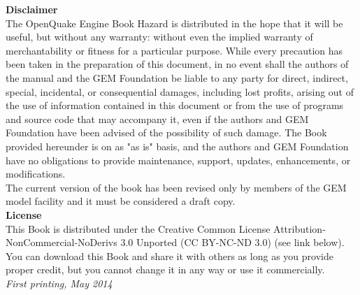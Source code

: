 \documentclass[11pt,fleqn]{book} %
\begin{document}
\noindent 
   {\bf{Disclaimer}} \hfill \\
   The OpenQuake Engine Book Hazard is distributed in 
   the hope that it will be useful, but without any warranty: without 
   even the implied warranty of merchantability or fitness for a 
   particular purpose. While every 
   precaution has been taken in the preparation of this document, in 
   no event shall the authors of the manual and the GEM Foundation be 
   liable to any party for direct, indirect, special, incidental, or 
   consequential damages, including lost profits, arising out of the 
   use of information contained in this document or from the use of 
   programs and source code that may accompany it, even if the authors 
   and GEM Foundation have been advised of the possibility of such damage. 
   The Book provided hereunder is on as "as is" basis, and the authors 
   and GEM Foundation have no obligations to provide maintenance, support,
   updates, enhancements, or modifications. 
   \hfill \\
   The current version of the book has been revised only by members of 
   the GEM model facility and it must be considered a draft copy. 
   \vspace{0.4cm} \hfill \\
   {\bf{License}} \hfill \\
   This Book is distributed under the Creative Common License 
   Attribution-NonCommercial-NoDerivs 3.0 Unported (CC BY-NC-ND 3.0) 
   (see link below). You can download this Book and share it with 
   others as long as you provide proper credit, but you cannot change 
   it in any way or use it commercially. 
   \hfill \\

\noindent \textit{First printing, May 2014} %



\pagestyle{empty} %

\tableofcontents %

\cleardoublepage %

\pagestyle{fancy} %
\end{document}

